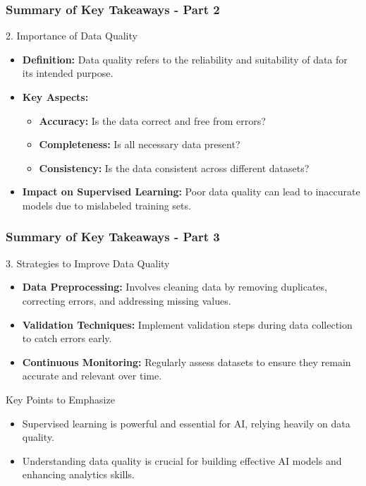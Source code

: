 \documentclass[aspectratio=169]{beamer}
\begin{document}
\begin{frame}[fragile]
    \frametitle{Summary of Key Takeaways - Part 2}
    \begin{block}{2. Importance of Data Quality}
        \begin{itemize}
            \item \textbf{Definition:} Data quality refers to the reliability and suitability of data for its intended purpose.
            \item \textbf{Key Aspects:}
                \begin{itemize}
                    \item \textbf{Accuracy:} Is the data correct and free from errors?
                    \item \textbf{Completeness:} Is all necessary data present?
                    \item \textbf{Consistency:} Is the data consistent across different datasets?
                \end{itemize}
            \item \textbf{Impact on Supervised Learning:} Poor data quality can lead to inaccurate models due to mislabeled training sets.
        \end{itemize}
    \end{block}
\end{frame}

\begin{frame}[fragile]
    \frametitle{Summary of Key Takeaways - Part 3}
    \begin{block}{3. Strategies to Improve Data Quality}
        \begin{itemize}
            \item \textbf{Data Preprocessing:} Involves cleaning data by removing duplicates, correcting errors, and addressing missing values.
            \item \textbf{Validation Techniques:} Implement validation steps during data collection to catch errors early.
            \item \textbf{Continuous Monitoring:} Regularly assess datasets to ensure they remain accurate and relevant over time.
        \end{itemize}
    \end{block}
    
    \begin{block}{Key Points to Emphasize}
        \begin{itemize}
            \item Supervised learning is powerful and essential for AI, relying heavily on data quality.
            \item Understanding data quality is crucial for building effective AI models and enhancing analytics skills.
        \end{itemize}
    \end{block}
\end{frame}
\end{document}
